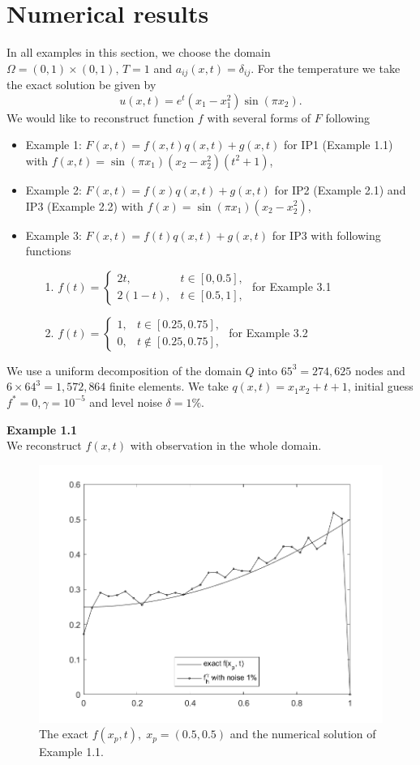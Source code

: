 \documentclass[]{article}
\begin{document}
\section{Numerical results}
In all examples in this section, we choose the domain $\Omega=(0, 1)\times(0, 1),\, T=1$ and $a_{ij}(x, t)=\delta_{ij}$.
For the temperature we take the exact solution be given by
$$u(x, t)=e^t(x_1-x_1^2)\sin(\pi x_2).$$
We would like to reconstruct function $f$ with several forms of $F$ following
\begin{itemize}
	\item Example 1: $F(x, t)=f(x, t)q(x, t)+g(x, t)$ for IP1 (Example 1.1) with $f(x, t)=\sin(\pi x_1)(x_2-x_2^2)(t^2+1)$,
	\item Example 2: $F(x, t)=f(x)q(x, t)+g(x, t)$ for IP2 (Example 2.1) and IP3 (Example 2.2) with $f(x)=\sin(\pi x_1)(x_2-x_2^2)$,
	\item Example 3: $F(x, t)=f(t)q(x, t)+g(x, t)$ for IP3 with following functions
	\begin{itemize}
		\item[1.]$f(t)=
		\begin{cases}
		2t, & t\in [0, 0.5],\\
		2(1-t), & t \in [0.5, 1],
		\end{cases}$ \qquad for Example 3.1
		\item[2.] $f(t)=
		\begin{cases}
		1, & t\in [0.25, 0.75],\\
		0, & t \notin [0.25, 0.75],
		\end{cases}$ \qquad for Example 3.2
	\end{itemize}
\end{itemize}
We use a uniform decomposition of the domain $Q$ into $65^3=274,625$ nodes and $6\times 64^3=1,572,864$ finite elements. We take $q(x, t)=x_1x_2+t+1$, initial guess $f^*=0, \gamma=10^{-5}$ and level noise $\delta =1\%$.

\newpage
\noindent\textbf{Example 1.1}
\\
We reconstruct $f(x, t)$ with observation in the whole domain.
\begin{figure}[h!]
	\centering
	\includegraphics[width=.5\linewidth]{../Csharp/Results/HS_Q_fxt}
	\caption{The exact $f(x_p, t),\; x_p=(0.5, 0.5)$ and the numerical solution of Example 1.1.}
\end{figure}
\end{document}
